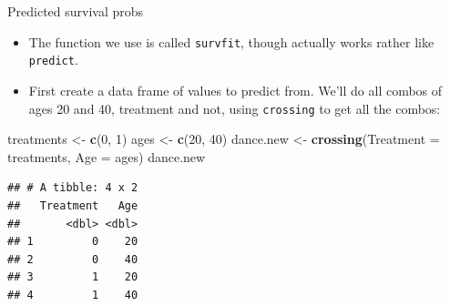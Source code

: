\documentclass[
  ignorenonframetext,
]{beamer}
\newenvironment{Shaded}{\begin{snugshade}}{\end{snugshade}}
\newcommand{\DataTypeTok}[1]{\textcolor[rgb]{0.13,0.29,0.53}{#1}}
\newcommand{\DecValTok}[1]{\textcolor[rgb]{0.00,0.00,0.81}{#1}}
\newcommand{\KeywordTok}[1]{\textcolor[rgb]{0.13,0.29,0.53}{\textbf{#1}}}
\newcommand{\NormalTok}[1]{#1}
\newcommand{\StringTok}[1]{\textcolor[rgb]{0.31,0.60,0.02}{#1}}
\providecommand{\tightlist}{%
  \setlength{\itemsep}{0pt}\setlength{\parskip}{0pt}}
\begin{document}
\begin{frame}[fragile]{Predicted survival probs}
\protect\hypertarget{predicted-survival-probs-1}{}

\begin{itemize}
\tightlist
\item
  The function we use is called \texttt{survfit}, though actually works
  rather like \texttt{predict}.
\item
  First create a data frame of values to predict from. We'll do all
  combos of ages 20 and 40, treatment and not, using \texttt{crossing}
  to get all the combos:
\end{itemize}

\small

\begin{Shaded}
\begin{Highlighting}[]
\NormalTok{treatments <-}\StringTok{ }\KeywordTok{c}\NormalTok{(}\DecValTok{0}\NormalTok{, }\DecValTok{1}\NormalTok{)}
\NormalTok{ages <-}\StringTok{ }\KeywordTok{c}\NormalTok{(}\DecValTok{20}\NormalTok{, }\DecValTok{40}\NormalTok{)}
\NormalTok{dance.new <-}\StringTok{ }\KeywordTok{crossing}\NormalTok{(}\DataTypeTok{Treatment =}\NormalTok{ treatments, }\DataTypeTok{Age =}\NormalTok{ ages)}
\NormalTok{dance.new}
\end{Highlighting}
\end{Shaded}

\begin{verbatim}
## # A tibble: 4 x 2
##   Treatment   Age
##       <dbl> <dbl>
## 1         0    20
## 2         0    40
## 3         1    20
## 4         1    40
\end{verbatim}

\normalsize

\end{frame}
\end{document}

